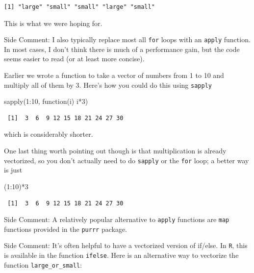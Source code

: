 \documentclass[
  letterpaper,
  DIV=11,
  numbers=noendperiod]{scrreprt}
\newenvironment{Shaded}{\begin{snugshade}}{\end{snugshade}}
\newcommand{\ControlFlowTok}[1]{\textcolor[rgb]{0.00,0.23,0.31}{#1}}
\newcommand{\DecValTok}[1]{\textcolor[rgb]{0.68,0.00,0.00}{#1}}
\newcommand{\FunctionTok}[1]{\textcolor[rgb]{0.28,0.35,0.67}{#1}}
\newcommand{\NormalTok}[1]{\textcolor[rgb]{0.00,0.23,0.31}{#1}}
\newcommand{\SpecialCharTok}[1]{\textcolor[rgb]{0.37,0.37,0.37}{#1}}
\begin{document}
\begin{verbatim}
[1] "large" "small" "small" "large" "small"
\end{verbatim}

This is what we were hoping for.

{Side Comment:} I also typically replace most all \texttt{for} loops
with an \texttt{apply} function. In most cases, I don't think there is
much of a performance gain, but the code seems easier to read (or at
least more concise).

Earlier we wrote a function to take a vector of numbers from 1 to 10 and
multiply all of them by 3. Here's how you could do this using
\texttt{sapply}

\begin{Shaded}
\begin{Highlighting}[]
\FunctionTok{sapply}\NormalTok{(}\DecValTok{1}\SpecialCharTok{:}\DecValTok{10}\NormalTok{, }\ControlFlowTok{function}\NormalTok{(i) i}\SpecialCharTok{*}\DecValTok{3}\NormalTok{)}
\end{Highlighting}
\end{Shaded}

\begin{verbatim}
 [1]  3  6  9 12 15 18 21 24 27 30
\end{verbatim}

which is considerably shorter.

One last thing worth pointing out though is that multiplication is
already vectorized, so you don't actually need to do \texttt{sapply} or
the \texttt{for} loop; a better way is just

\begin{Shaded}
\begin{Highlighting}[]
\NormalTok{(}\DecValTok{1}\SpecialCharTok{:}\DecValTok{10}\NormalTok{)}\SpecialCharTok{*}\DecValTok{3}
\end{Highlighting}
\end{Shaded}

\begin{verbatim}
 [1]  3  6  9 12 15 18 21 24 27 30
\end{verbatim}

{Side Comment:} A relatively popular alternative to \texttt{apply}
functions are \texttt{map} functions provided in the \texttt{purrr}
package.

{Side Comment:} It's often helpful to have a vectorized version of
if/else. In \texttt{R}, this is available in the function
\texttt{ifelse}. Here is an alternative way to vectorize the function
\texttt{large\_or\_small}:
\end{document}
